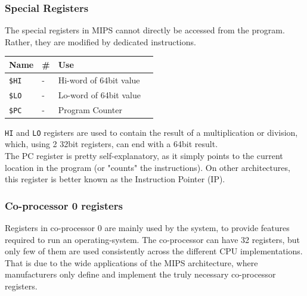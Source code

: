 \subsubsection{Special Registers}
The special registers in MIPS cannot directly be accessed from the program.
Rather, they are modified by dedicated instructions.
\begin{center}
    \begin{tabular}{ | l | l | l | c |}
    \hline
	\textbf{Name} & \textbf{\#} & \textbf{Use} \\ \hline \hline
	\texttt{\$HI}		& -	& Hi-word of 64bit value \\ \hline
	\texttt{\$LO}		& -	& Lo-word of 64bit value \\ \hline
	\texttt{\$PC}		& -	& Program Counter \\ \hline
    \end{tabular}
\end{center}
\texttt{HI} and \texttt{LO} registers are used to contain the result of a
multiplication or division, which, using 2 32bit registers, can end with a
64bit result.\\
The PC register is pretty self-explanatory, as it simply points to the current
location in the program (or "counts" the instructions). On other
architectures,
this register is better known as the Instruction Pointer (IP).

\subsubsection{Co-processor 0 registers}
Registers in co-processor 0 are mainly used by the system, to provide features
required to run an operating-system. The co-processor can have 32 registers, but only few of
them are used consistently across the different CPU implementations. That is
due to the wide applications of the MIPS architecture, where manufacturers
only define and implement the truly necessary co-processor registers.

